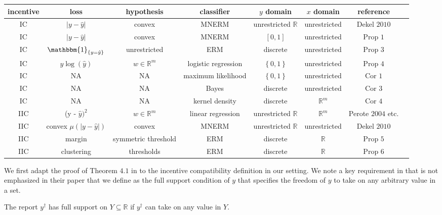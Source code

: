 \documentclass{article}
\begin{document}
\begin{center} \begin{tabular}{|c|c|c|c|c|c|c|c|}
\hline
 incentive &loss &hypothesis &classifier &$y $ domain &$x $ domain &reference\\ \hline
IC &$\left| y - \hat{y} \right|$ &convex &MNERM &unrestricted $\mathbb{R}$ &unrestricted &Dekel $2010$\\ \hline
IC &$\left| y - \hat{y} \right|$ &convex &MNERM &$\left[0, 1\right]$ &unrestricted &Prop $1$\\ \hline
IC &$\mathbbm{1}_{\left\{y = \hat{y}\right\}}$ &unrestricted &ERM &discrete &unrestricted &Prop $3$\\ \hline
IC &$y  \log \left(\hat{y}\right)$ &$w \in \mathbb{R}^{m}$ &logistic regression &$\left\{0, 1\right\}$ &unrestricted &Prop $4$\\ \hline
IC &NA &NA &maximum likelihood &$\left\{0, 1\right\}$ &unrestricted &Cor $1$\\ \hline
IC &NA &NA &Bayes &discrete &unrestricted &Cor $3$\\ \hline
IC &NA &NA &kernel density &discrete &$\mathbb{R}^{m}$ &Cor $4$\\ \hline
IIC &(y - $\hat{y})^{2}$ &$w \in \mathbb{R}^{m}$ &linear regression &unrestricted $\mathbb{R}$ &$\mathbb{R}^{m}$ &Perote $2004$ etc.\\ \hline
IIC &convex $\mu\left(\left| y - \hat{y} \right|\right)$ &convex &MNERM &unrestricted $\mathbb{R}$ &unrestricted &Dekel $2010$\\ \hline
IIC &margin &symmetric threshold &ERM &discrete &$\mathbb{R}$ &Prop $5$\\ \hline
IIC &clustering &thresholds &ERM &discrete &$\mathbb{R}$ &Prop $6$\\ \hline
\end{tabular} \end{center}
We first adapt the proof of Theorem $4.1$ in \citet*{dekel2010incentive} to the incentive compatibility definition in our setting. We note a key requirement in \citet*{dekel2010incentive} that is not emphasized in their paper that we define as the full support condition of $y $ that specifies the freedom of $y $ to take on any arbitrary value in a set.
\newline \newline
\begin{df} \label{df:full} 
The report $y^{\dagger}$ has full support on $Y  \subseteq \mathbb{R}$ if $y^{\dagger}$ can take on any value in $Y. $
\newline \newline\end{df}
\end{document}
